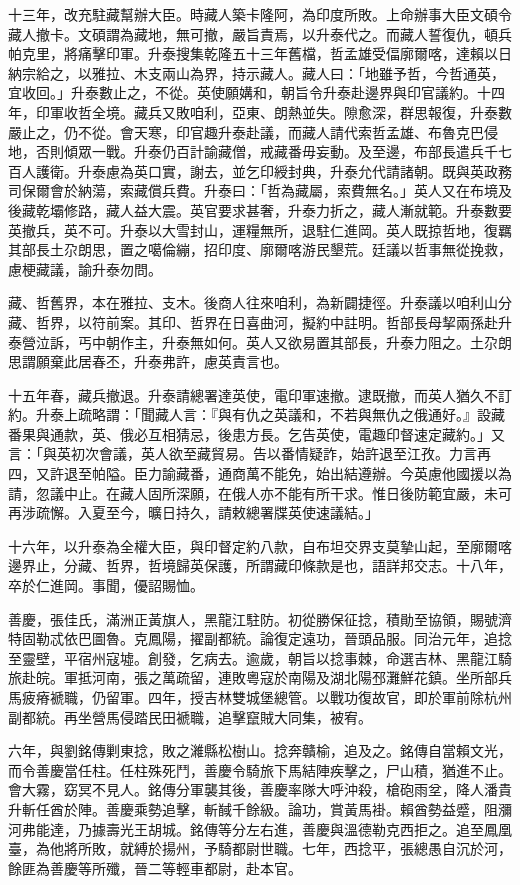 \begin{pinyinscope}
十三年，改充駐藏幫辦大臣。時藏人築卡隆阿，為印度所敗。上命辦事大臣文碩令藏人撤卡。文碩謂為藏地，無可撤，嚴旨責焉，以升泰代之。而藏人誓復仇，頓兵帕克里，將痛擊印軍。升泰搜集乾隆五十三年舊檔，哲孟雄受偪廓爾喀，達賴以日納宗給之，以雅拉、木支兩山為界，持示藏人。藏人曰：「地雖予哲，今哲通英，宜收回。」升泰數止之，不從。英使願媾和，朝旨令升泰赴邊界與印官議約。十四年，印軍收哲全境。藏兵又敗咱利，亞東、朗熱並失。隙愈深，群思報復，升泰數嚴止之，仍不從。會天寒，印官趣升泰赴議，而藏人請代索哲孟雄、布魯克巴侵地，否則傾眾一戰。升泰仍百計諭藏僧，戒藏番毋妄動。及至邊，布部長遣兵千七百人護衛。升泰慮為英口實，謝去，並乞印綬封典，升泰允代請諸朝。既與英政務司保爾會於納蕩，索藏償兵費。升泰曰：「哲為藏屬，索費無名。」英人又在布境及後藏乾壩修路，藏人益大震。英官要求甚奢，升泰力折之，藏人漸就範。升泰數要英撤兵，英不可。升泰以大雪封山，運糧無所，退駐仁進岡。英人既掠哲地，復羈其部長土尕朗思，置之噶倫繃，招印度、廓爾喀游民墾荒。廷議以哲事無從挽救，慮梗藏議，諭升泰勿問。

藏、哲舊界，本在雅拉、支木。後商人往來咱利，為新闢捷徑。升泰議以咱利山分藏、哲界，以符前案。其印、哲界在日喜曲河，擬約中註明。哲部長母挈兩孫赴升泰營泣訴，丐中朝作主，升泰無如何。英人又欲易置其部長，升泰力阻之。土尕朗思謂願棄此居春丕，升泰弗許，慮英責言也。

十五年春，藏兵撤退。升泰請總署達英使，電印軍速撤。逮既撤，而英人猶久不訂約。升泰上疏略謂：「聞藏人言：『與有仇之英議和，不若與無仇之俄通好。』設藏番果與通款，英、俄必互相猜忌，後患方長。乞告英使，電趣印督速定藏約。」又言：「與英初次會議，英人欲至藏貿易。告以番情疑詐，始許退至江孜。力言再四，又許退至帕隘。臣力諭藏番，通商萬不能免，始出結遵辦。今英慮他國援以為請，忽議中止。在藏人固所深願，在俄人亦不能有所干求。惟日後防範宜嚴，未可再涉疏懈。入夏至今，曠日持久，請敕總署牒英使速議結。」

十六年，以升泰為全權大臣，與印督定約八款，自布坦交界支莫摯山起，至廓爾喀邊界止，分藏、哲界，哲境歸英保護，所謂藏印條款是也，語詳邦交志。十八年，卒於仁進岡。事聞，優詔賜恤。

善慶，張佳氏，滿洲正黃旗人，黑龍江駐防。初從勝保征捻，積勛至協領，賜號濟特固勒忒依巴圖魯。克鳳陽，擢副都統。論復定遠功，晉頭品服。同治元年，追捻至靈壁，平宿州寇墟。創發，乞病去。逾歲，朝旨以捻事棘，命選吉林、黑龍江騎旅赴皖。軍抵河南，張之萬疏留，連敗粵寇於南陽及湖北陽邳灘鮮花鎮。坐所部兵馬疲瘠褫職，仍留軍。四年，授吉林雙城堡總管。以戰功復故官，即於軍前除杭州副都統。再坐營馬侵踏民田褫職，追擊竄賊大同集，被宥。

六年，與劉銘傳剿東捻，敗之濰縣松樹山。捻奔贛榆，追及之。銘傳自當賴文光，而令善慶當任柱。任柱殊死鬥，善慶令騎旅下馬結陣疾擊之，尸山積，猶進不止。會大霧，窈冥不見人。銘傳分軍襲其後，善慶率隊大呼沖殺，槍砲雨坌，降人潘貴升斬任酋於陣。善慶乘勢追擊，斬馘千餘級。論功，賞黃馬褂。賴酋勢益蹙，阻瀰河弗能達，乃據壽光王胡城。銘傳等分左右進，善慶與溫德勒克西拒之。追至鳳凰臺，為他將所敗，就縛於揚州，予騎都尉世職。七年，西捻平，張總愚自沉於河，餘匪為善慶等所殲，晉二等輕車都尉，赴本官。


\end{pinyinscope}
